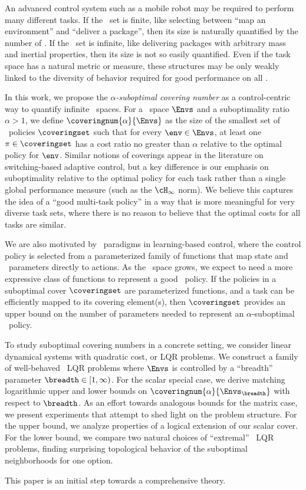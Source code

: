 An advanced control system such as a mobile robot may be required to perform many different tasks.
If the \envword\ set is finite, like selecting between ``map an environment'' and ``deliver a package'',
then its size is naturally quantified by the number of \envwords.
If the \envword\ set is infinite, like delivering packages with arbitrary mass and inertial properties,
then its size is not so easily quantified.
Even if the task space has a natural metric or measure,
these structures may be only weakly linked to the diversity of behavior
required for good performance on all \envwords.

In this work, we propose the 
\emph{$\alpha$-suboptimal covering number}
as a control-centric way to quantify infinite \envword\ spaces.
For a \envword\ space $\Envs$
and a suboptimality ratio $\alpha > 1$,
we define $\coveringnum{\alpha}{\Envs}$ as
the size of the smallest set of \singleenv\ policies $\coveringset$ %
such that for every $\env \in \Envs$, at least one ${\pi \in \coveringset}$
has a cost ratio no greater than $\alpha$ relative to the optimal policy for $\env$.
Similar notions of coverings appear in the literature on switching-based adaptive control,
but a key difference is our emphasis on suboptimality relative to the optimal policy for each task
rather than a single global performance measure (such as the $\cH_\infty$ norm).
We believe this captures the idea of a ``good multi-task policy''
in a way that is more meaningful for very diverse task sets,
where there is no reason to believe that the optimal costs for all tasks are similar.

We are also motivated by
\multienv\ paradigms in learning-based control, where the control policy is selected
from a parameterized family of functions
that map state and \envword\ parameters directly to actions.
As the \envword\ space grows, %
we expect to need a more expressive class of functions
to represent a good \multienv\ policy.
If the policies in a suboptimal cover $\coveringset$ are parameterized functions,
and a task can be efficiently mapped to its covering element(s),
then $\coveringset$ provides an upper bound on the number of parameters
needed to represent an $\alpha$-suboptimal \multienv\ policy.

To study suboptimal covering numbers in a concrete setting,
we consider linear dynamical systems with quadratic cost, or LQR problems.
We construct a family of well-behaved \multienv\ LQR problems 
where $\Envs$ is controlled by a ``breadth'' parameter $\breadth \in [1, \infty)$.
For the scalar special case,
we derive matching logarithmic upper and lower bounds on
$\coveringnum{\alpha}{\Envs_\breadth}$
with respect to $\breadth$.
As an effort towards analogous bounds for the matrix case,
we present experiments that attempt to shed light on the problem structure.
For the upper bound, we analyze properties of a logical extension of our scalar cover.
For the lower bound, we compare two natural choices of ``extremal''  \multienv\ LQR problems,
finding surprising topological behavior of the suboptimal neighborhoods for one option.

This paper is an initial step towards a comprehensive theory.






